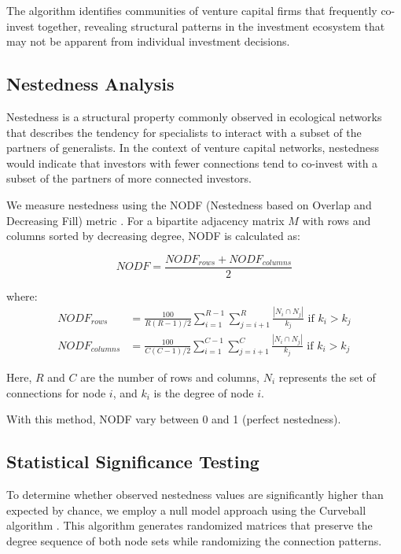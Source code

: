 The algorithm identifies communities of venture capital firms that frequently co-invest together, revealing structural patterns in the investment ecosystem that may not be apparent from individual investment decisions.

\subsection{Nestedness Analysis}

Nestedness is a structural property commonly observed in ecological networks \cite{AlmeidaNeto2008} that describes the tendency for specialists to interact with a subset of the partners of generalists. In the context of venture capital networks, nestedness would indicate that investors with fewer connections tend to co-invest with a subset of the partners of more connected investors.

We measure nestedness using the NODF (Nestedness based on Overlap and Decreasing Fill) metric \cite{AlmeidaNeto2008}. For a bipartite adjacency matrix $M$ with rows and columns sorted by decreasing degree, NODF is calculated as:

\begin{equation}
NODF = \frac{NODF_{rows} + NODF_{columns}}{2}
\end{equation}

where:
\begin{align}
NODF_{rows} &= \frac{100}{R(R-1)/2} \sum_{i=1}^{R-1} \sum_{j=i+1}^{R} \frac{|N_i \cap N_j|}{k_j} \text{ if } k_i > k_j \\
NODF_{columns} &= \frac{100}{C(C-1)/2} \sum_{i=1}^{C-1} \sum_{j=i+1}^{C} \frac{|N_i \cap N_j|}{k_j} \text{ if } k_i > k_j
\end{align}

Here, $R$ and $C$ are the number of rows and columns, $N_i$ represents the set of connections for node $i$, and $k_i$ is the degree of node $i$.

With this method, NODF vary between 0 and 1 (perfect nestedness).

\subsection{Statistical Significance Testing}

To determine whether observed nestedness values are significantly higher than expected by chance, we employ a null model approach using the Curveball algorithm \cite{Strona2014}. This algorithm generates randomized matrices that preserve the degree sequence of both node sets while randomizing the connection patterns.

